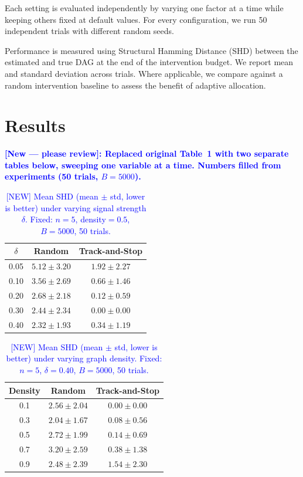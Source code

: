 \documentclass{article}
\newcommand{\added}[1]{\textcolor{blue}{#1}}
\begin{document}
Each setting is evaluated independently by varying one factor at a time while keeping others fixed at default values. For every configuration, we run 50 independent trials with different random seeds.

Performance is measured using Structural Hamming Distance (SHD) between the estimated and true DAG at the end of the intervention budget. We report mean and standard deviation across trials. Where applicable, we compare against a random intervention baseline to assess the benefit of adaptive allocation.

\section{Results}

\added{\textbf{[New — please review]: Replaced original Table~1 with two separate tables below, sweeping one variable at a time. Numbers filled from experiments (50 trials, $B=5000$).}}

\begin{table}[h]
\centering
\caption{\added{[NEW] Mean SHD (mean $\pm$ std, lower is better) under varying signal strength $\delta$. Fixed: $n=5$, density$=0.5$, $B=5000$, 50 trials.}}
\label{tab:signal_strength}
\begin{tabular}{c|cc}
\toprule
$\delta$ & Random & Track-and-Stop \\
\midrule
0.05 & $5.12 \pm 3.20$ & $1.92 \pm 2.27$ \\
0.10 & $3.56 \pm 2.69$ & $0.66 \pm 1.46$ \\
0.20 & $2.68 \pm 2.18$ & $0.12 \pm 0.59$ \\
0.30 & $2.44 \pm 2.34$ & $0.00 \pm 0.00$ \\
0.40 & $2.32 \pm 1.93$ & $0.34 \pm 1.19$ \\
\bottomrule
\end{tabular}
\end{table}

\begin{table}[h]
\centering
\caption{\added{[NEW] Mean SHD (mean $\pm$ std, lower is better) under varying graph density. Fixed: $n=5$, $\delta=0.40$, $B=5000$, 50 trials.}}
\label{tab:graph_density}
\begin{tabular}{c|cc}
\toprule
Density & Random & Track-and-Stop \\
\midrule
0.1 & $2.56 \pm 2.04$ & $0.00 \pm 0.00$ \\
0.3 & $2.04 \pm 1.67$ & $0.08 \pm 0.56$ \\
0.5 & $2.72 \pm 1.99$ & $0.14 \pm 0.69$ \\
0.7 & $3.20 \pm 2.59$ & $0.38 \pm 1.38$ \\
0.9 & $2.48 \pm 2.39$ & $1.54 \pm 2.30$ \\
\bottomrule
\end{tabular}
\end{table}
\end{document}
